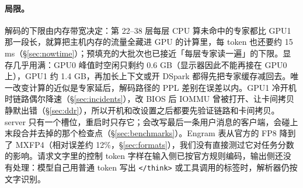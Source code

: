\documentclass[11pt,a4paper]{article}
\newcommand{\code}[1]{\texttt{#1}}
\begin{document}
\paragraph{局限。} 解码的下限由内存带宽决定：第 22--38 层每层 CPU 算未命中的专家都比 GPU1 那一段长，就算把主机内存的流量全藏进 GPU 的计算里，每 token 也还要约 15 ms（\S\ref{sec:nowtime}）；预填充的大批次也已接近「每层专家读一遍」的下限。显存几乎用满：GPU0 峰值时空闲只剩约 0.6 GB（显示器因此不能再接在 GPU0 上），GPU1 约 1.4 GB，再加长上下文或开 DSpark 都得先把专家缓存减回去。唯一改变计算的近似是专家延后，解码路径的 PPL 差别在误差以内。GPU1 冷开机时链路偶尔降速（\S\ref{sec:incidents}），改 BIOS 后 IOMMU 曾被打开、让卡间拷贝静默出错（\S\ref{sec:ddr}），所以开机和改设置之后都要先验证链路和卡间拷贝。server 只有一个槽位，重启时只存它；会改写最后一条用户消息的客户端，会碰上末段合并去掉的那个检查点（\S\ref{sec:benchmarks}）。Engram 表从官方的 FP8 降到了 MXFP4（相对误差约 12\%，\S\ref{sec:formats}），我们没有直接测过它对任务分数的影响。请求文字里的控制 token 字样在输入侧已按官方规则编码，输出侧还没有处理：模型自己用普通 token 写出 \code{</think>} 或工具调用的标签时，解析器仍按文字识别。
\end{document}
